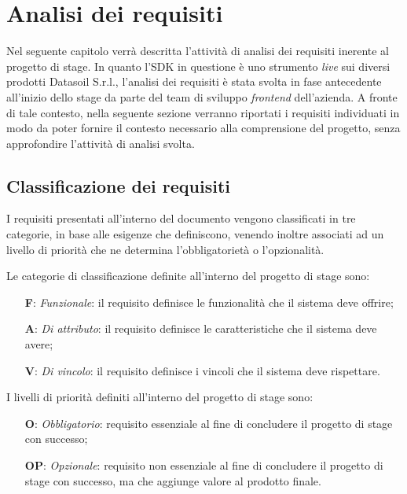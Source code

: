 \chapter{Analisi dei requisiti}
\label{chap:analisi-requisiti}
Nel seguente capitolo verrà descritta l'attività di analisi dei requisiti inerente al progetto di stage. \newline
In quanto l'SDK in questione è uno strumento \textit{live} sui diversi prodotti Datasoil S.r.l., l'analisi dei requisiti è stata svolta
in fase antecedente all'inizio dello stage da parte del team di sviluppo \textit{\gls{frontend}\glox} dell'azienda. \newline
A fronte di tale contesto, nella seguente sezione verranno riportati i requisiti individuati in modo da poter fornire il contesto
necessario alla comprensione del progetto, senza approfondire l'attività di analisi svolta.

\section{Classificazione dei requisiti}
I requisiti presentati all'interno del documento vengono classificati in tre categorie, in base alle esigenze che definiscono, venendo inoltre
associati ad un livello di priorità che ne determina l'obbligatorietà o l'opzionalità. \newline

\newline
Le categorie di classificazione definite all'interno del progetto di stage sono:

\begin{itemize}
    \item[\textbf{F}:] \textit{Funzionale}: il requisito definisce le funzionalità che il sistema deve offrire;
    \item[\textbf{A}:] \textit{Di attributo}: il requisito definisce le caratteristiche che il sistema deve avere;
    \item[\textbf{V}:] \textit{Di vincolo}: il requisito definisce i vincoli che il sistema deve rispettare.
\end{itemize}

\newline
I livelli di priorità definiti all'interno del progetto di stage sono:

\begin{itemize}
    \item[\textbf{O}:] \textit{Obbligatorio}: requisito essenziale al fine di concludere il progetto di stage con successo;
    \item[\textbf{OP}:] \textit{Opzionale}: requisito non essenziale al fine di concludere il progetto di stage con successo, ma che aggiunge valore al prodotto finale.
\end{itemize}

